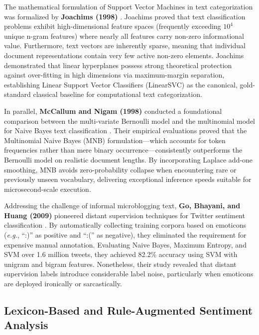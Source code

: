 The mathematical formulation of Support Vector Machines in text categorization was formalized by \textbf{Joachims (1998)} \cite{joachims1998text}. Joachims proved that text classification problems exhibit high-dimensional feature spaces (frequently exceeding $10^4$ unique n-gram features) where nearly all features carry non-zero informational value. Furthermore, text vectors are inherently sparse, meaning that individual document representations contain very few active non-zero elements. Joachims demonstrated that linear hyperplanes possess strong theoretical protection against over-fitting in high dimensions via maximum-margin separation, establishing Linear Support Vector Classifiers (LinearSVC) as the canonical, gold-standard classical baseline for computational text categorization.

In parallel, \textbf{McCallum and Nigam (1998)} conducted a foundational comparison between the multi-variate Bernoulli model and the multinomial model for Naive Bayes text classification \cite{mccallum1998comparison}. Their empirical evaluations proved that the Multinomial Naive Bayes (MNB) formulation—which accounts for token frequencies rather than mere binary occurrence—consistently outperforms the Bernoulli model on realistic document lengths. By incorporating Laplace add-one smoothing, MNB avoids zero-probability collapse when encountering rare or previously unseen vocabulary, delivering exceptional inference speeds suitable for microsecond-scale execution.

Addressing the challenge of informal microblogging text, \textbf{Go, Bhayani, and Huang (2009)} pioneered distant supervision techniques for Twitter sentiment classification \cite{go2009twitter}. By automatically collecting training corpora based on emoticons (\textit{e.g.}, ``:)'' as positive and ``:('' as negative), they eliminated the requirement for expensive manual annotation. Evaluating Naive Bayes, Maximum Entropy, and SVM over 1.6 million tweets, they achieved 82.2\% accuracy using SVM with unigram and bigram features. Nonetheless, their study revealed that distant supervision labels introduce considerable label noise, particularly when emoticons are deployed ironically or sarcastically.

\subsection{Lexicon-Based and Rule-Augmented Sentiment Analysis}

